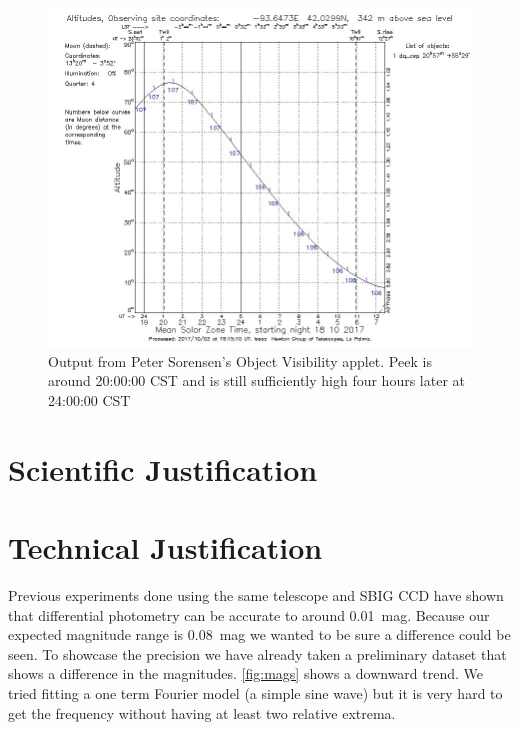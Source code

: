 \documentclass[]{article}
\begin{document}
	
	\begin{figure}[p]
		\includegraphics[width=\linewidth]{figs/staralt.png}
		\caption{Output from Peter Sorensen's Object Visibility applet. Peek is around 20:00:00 CST and is still sufficiently high four hours later at 24:00:00 CST}
		\label{fig:staralt}
	\end{figure}

\section{Scientific Justification}

\section{Technical Justification}

	Previous experiments done using the same telescope and SBIG CCD have shown that differential photometry can be accurate to around \SI{0.01}{mag}. Because our expected magnitude range is \SI{0.08}{mag} we wanted to be sure a difference could be seen. To showcase the precision we have already taken a preliminary dataset that shows a difference in the magnitudes. \autoref{fig:mags} shows a downward trend. We tried fitting a one term Fourier model (a simple sine wave) but it is very hard to get the frequency without having at least two relative extrema.
\end{document}
